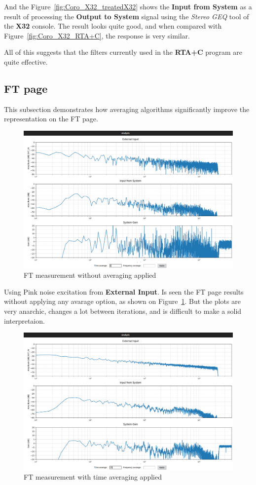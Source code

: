 And the Figure~\ref{fig:Coro_X32_treatedX32} shows the \textbf{Input from System} as a result of processing the \textbf{Output to System} signal using the \textit{Stereo GEQ} tool of the \textbf{X32} console. The result looks quite good, and when compared with Figure~\ref{fig:Coro_X32_RTA+C}, the response is very similar.

All of this suggests that the filters currently used in the \textbf{RTA+C} program are quite effective.


\subsection{FT page}

This subsection demonstrates how averaging algorithms significantly improve the representation on the FT page.

\begin{figure}[H]
	\centering
	\includegraphics[width=0.8
	\linewidth]{Figures/Coro_FT_NO_av.png}
	\caption{FT measurement without averaging applied}
	\label{fig:Coro_FT_no_av}
\end{figure}

Using Pink noise excitation from \textbf{External Input}. Is seen the FT page results without applying any avarage option, as shown on Figure~\ref{fig:Coro_FT_no_av}. But the plots are very anarchic, changes a lot between iterations, and is difficult to make a solid interpretaion.

\begin{figure}[H]
	\centering
	\includegraphics[width=0.8
	\linewidth]{Figures/Coro_FT_time_av.png}
	\caption{FT measurement with time averaging applied}
	\label{fig:Coro_FT_time_av}
\end{figure}

